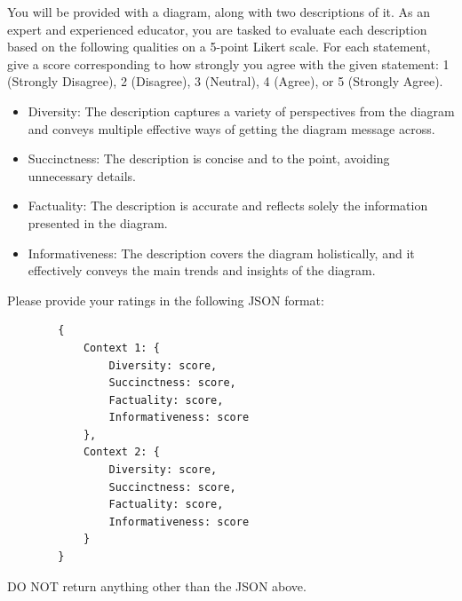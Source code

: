\centering
\begin{tcolorbox}[
    colback=white,
    colframe=gray!20,
    arc=10pt,
    boxrule=1pt,
    title={\textcolor{white}{\textbf{Prompt for VLM-as-a-Judge Evaluation of Description Pairs}}},
    coltitle=white,
    fonttitle=\large,
    colbacktitle=black!70,
]
You will be provided with a diagram, along with two descriptions of it. As an expert and experienced educator, you are tasked to evaluate each description based on the following qualities on a 5-point Likert scale. For each statement, give a score corresponding to how strongly you agree with the given statement: 1 (Strongly Disagree), 2 (Disagree), 3 (Neutral), 4 (Agree), or 5 (Strongly Agree).

\begin{itemize}
    \item Diversity: The description captures a variety of perspectives from the diagram and conveys multiple effective ways of getting the diagram message across.
    \item Succinctness: The description is concise and to the point, avoiding unnecessary details.
    \item Factuality: The description is accurate and reflects solely the information presented in the diagram.
    \item Informativeness: The description covers the diagram holistically, and it effectively conveys the main trends and insights of the diagram.
\end{itemize}

Please provide your ratings in the following JSON format:

\begin{verbatim}
        {
            Context 1: {
                Diversity: score,
                Succinctness: score,
                Factuality: score,
                Informativeness: score
            },
            Context 2: {
                Diversity: score,
                Succinctness: score,
                Factuality: score,
                Informativeness: score
            }
        }
\end{verbatim}

DO NOT return anything other than the JSON above.

\end{tcolorbox}



